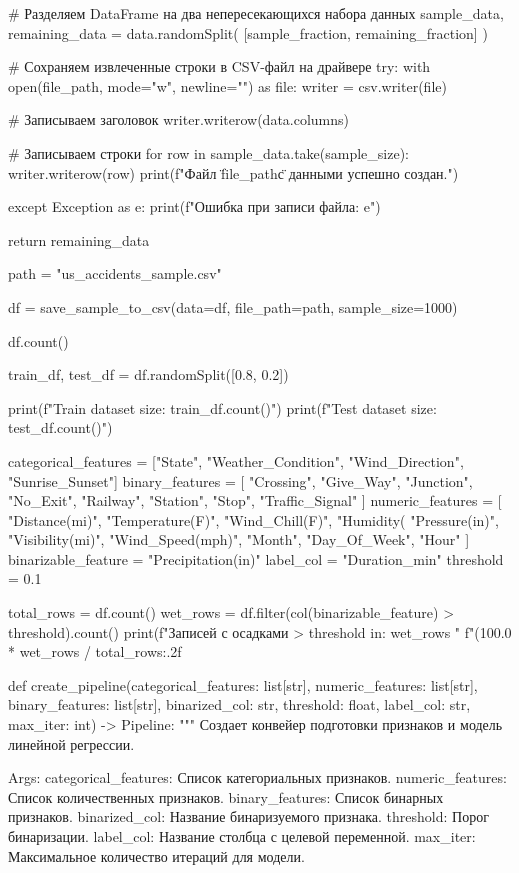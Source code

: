 \begin{code}
    # Разделяем DataFrame на два непересекающихся набора данных
    sample_data, remaining_data = data.randomSplit(
        [sample_fraction, remaining_fraction]
    )

    # Сохраняем извлеченные строки в CSV-файл на драйвере
    try:
        with open(file_path, mode="w", newline="") as file:
            writer = csv.writer(file)

            # Записываем заголовок
            writer.writerow(data.columns)

            # Записываем строки
            for row in sample_data.take(sample_size):
                writer.writerow(row)
        print(f"Файл \"{file_path}\" с данными успешно создан.")

    except Exception as e:
        print(f"Ошибка при записи файла: {e}")

    return remaining_data

path = "us_accidents_sample.csv"

df = save_sample_to_csv(data=df, file_path=path, sample_size=1000)

df.count()

train_df, test_df = df.randomSplit([0.8, 0.2])

print(f"Train dataset size: {train_df.count()}")
print(f"Test  dataset size: {test_df.count()}")

categorical_features = ["State", "Weather_Condition",
                      "Wind_Direction", "Sunrise_Sunset"]
binary_features = [
    "Crossing", "Give_Way", "Junction", "No_Exit",
    "Railway", "Station", "Stop", "Traffic_Signal"
]
numeric_features = [
    "Distance(mi)", "Temperature(F)", "Wind_Chill(F)", "Humidity(%
    "Pressure(in)", "Visibility(mi)", "Wind_Speed(mph)",
    "Month", "Day_Of_Week", "Hour"
]
binarizable_feature = "Precipitation(in)"
label_col = "Duration_min"
threshold = 0.1

total_rows = df.count()
wet_rows = df.filter(col(binarizable_feature) > threshold).count()
print(f"Записей с осадками > {threshold} in: {wet_rows} "
      f"({100.0 * wet_rows / total_rows:.2f} %

def create_pipeline(categorical_features: list[str], numeric_features: list[str],
                    binary_features: list[str], binarized_col: str,
                    threshold: float, label_col: str, max_iter: int) -> Pipeline:
    """
    Создает конвейер подготовки признаков и модель линейной регрессии.

    Args:
        categorical_features: Список категориальных признаков.
        numeric_features: Список количественных признаков.
        binary_features: Список бинарных признаков.
        binarized_col: Название бинаризуемого признака.
        threshold: Порог бинаризации.
        label_col: Название столбца с целевой переменной.
        max_iter: Максимальное количество итераций для модели.


\end{code}
